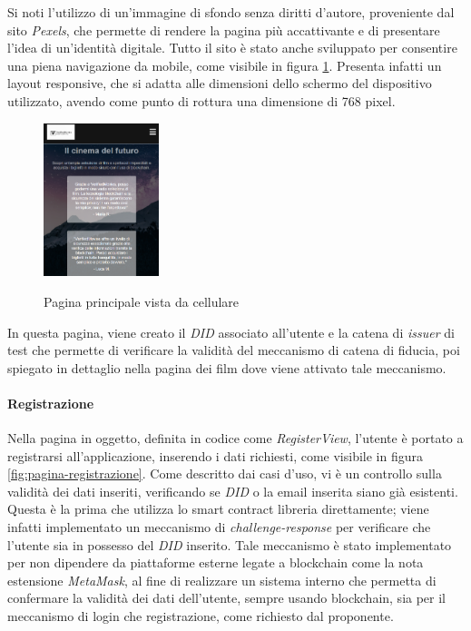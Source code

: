 Si noti l'utilizzo di un'immagine di sfondo senza diritti d'autore, proveniente dal sito \textit{Pexels}, che permette di rendere la pagina più accattivante e di presentare l'idea di un'identità digitale.
Tutto il sito è stato anche sviluppato per consentire una piena navigazione da mobile, come visibile in figura \ref{fig:pagina-principale-mobile}.
Presenta infatti un layout responsive, che si adatta alle dimensioni dello schermo del dispositivo utilizzato, avendo come punto di rottura una dimensione 
di 768 pixel.
\begin{figure}[h]
    \centering
    \includegraphics[width=0.3\textwidth, alt={Pagina principale dell'applicazione vista da cellulare}]{immagini/frontend/home-mobile.png}
    \caption{Pagina principale vista da cellulare}\label{fig:pagina-principale-mobile}
\end{figure}

In questa pagina, viene creato il \textit{DID} associato all'utente e la catena di \textit{issuer} di test che permette di verificare la validità del meccanismo di catena di fiducia,
poi spiegato in dettaglio nella pagina dei film dove viene attivato tale meccanismo.

\paragraph{Registrazione}

Nella pagina in oggetto, definita in codice come \textit{RegisterView}, l'utente è portato a registrarsi all'applicazione, inserendo i dati richiesti, come visibile in figura \ref{fig:pagina-registrazione}.
Come descritto dai casi d'uso, vi è un controllo sulla validità dei dati inseriti, verificando se \textit{DID} o la email inserita siano già esistenti.
Questa è la prima che utilizza lo smart contract libreria direttamente; viene infatti implementato un meccanismo di \textit{challenge-response}
per verificare che l'utente sia in possesso del \textit{DID} inserito. Tale meccanismo è stato implementato per non dipendere da piattaforme esterne legate a blockchain
come la nota estensione \textit{MetaMask}, al fine di realizzare un sistema interno che permetta di confermare la validità dei dati dell'utente, sempre usando blockchain,
sia per il meccanismo di login che registrazione, come richiesto dal proponente. 

